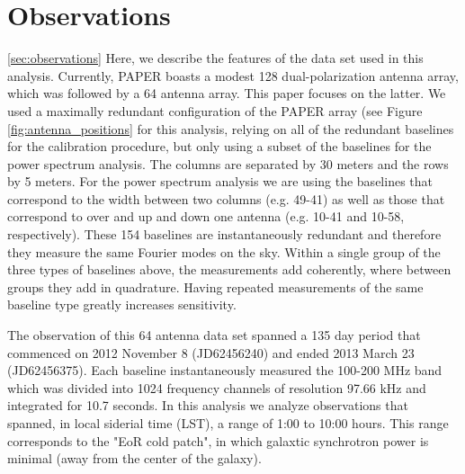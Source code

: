 \documentclass[twocolumn,numberedappendix]{emulateapj}
\begin{document}
\section{Observations}\ref{sec:observations}
Here, we describe the features of the data set used in this analysis. 
Currently, PAPER boasts a modest 128 dual-polarization antenna array, which was
followed by a 64 antenna array. This paper focuses on the latter.
We used a maximally redundant configuration of the PAPER array (see Figure
\ref{fig:antenna_positions} for this analysis, relying on all of the redundant
baselines for the calibration procedure, but only using a subset of the
baselines for the power spectrum analysis. The columns are separated by 30
meters and the rows by 5 meters. For the power spectrum analysis we
are using the baselines that correspond to the width between two columns (e.g.
49-41) as well as those that correspond to over and up and down one antenna
(e.g. 10-41 and 10-58, respectively). These 154 baselines are 
instantaneously redundant and therefore they measure the same Fourier modes on
the sky. Within a single group of the three types of baselines above, the
measurements add coherently, where between groups they add in quadrature. Having
repeated measurements of the same baseline type greatly increases sensitivity. 

The observation of this 64 antenna data set spanned a 135 day period that
commenced on 2012 November 8 (JD62456240) and ended  2013 March 23 (JD62456375). 
Each baseline instantaneously measured the 100-200 MHz band which was divided
into 1024 frequency channels of resolution 97.66 kHz and integrated for 10.7
seconds. In this analysis we analyze observations that spanned, in local
siderial time (LST), a range of 1:00 to 10:00 hours. This range corresponds to
the "EoR cold patch", in which galaxtic synchrotron power is minimal (away from
the center of the galaxy).
\end{document}
